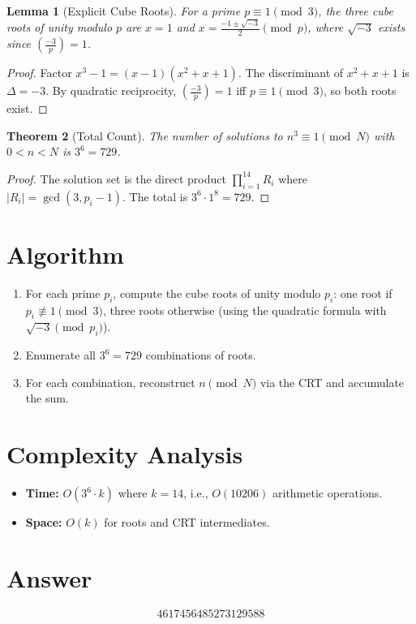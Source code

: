 \documentclass[12pt]{article}
\newtheorem{theorem}{Theorem}
\newtheorem{lemma}[theorem]{Lemma}
\begin{document}
\begin{lemma}[Explicit Cube Roots]
For a prime $p \equiv 1 \pmod{3}$, the three cube roots of unity modulo $p$ are $x = 1$ and $x = \frac{-1 \pm \sqrt{-3}}{2} \pmod{p}$, where $\sqrt{-3}$ exists since $\left(\frac{-3}{p}\right) = 1$.
\end{lemma}

\begin{proof}
Factor $x^3 - 1 = (x-1)(x^2+x+1)$. The discriminant of $x^2+x+1$ is $\Delta = -3$. By quadratic reciprocity, $\left(\frac{-3}{p}\right) = 1$ iff $p \equiv 1 \pmod{3}$, so both roots exist.
\end{proof}

\begin{theorem}[Total Count]
The number of solutions to $n^3 \equiv 1 \pmod{N}$ with $0 < n < N$ is $3^6 = 729$.
\end{theorem}

\begin{proof}
The solution set is the direct product $\prod_{i=1}^{14} R_i$ where $|R_i| = \gcd(3, p_i - 1)$. The total is $3^6 \cdot 1^8 = 729$.
\end{proof}

\section{Algorithm}
\begin{enumerate}
    \item For each prime $p_i$, compute the cube roots of unity modulo $p_i$: one root if $p_i \not\equiv 1 \pmod{3}$, three roots otherwise (using the quadratic formula with $\sqrt{-3} \pmod{p_i}$).
    \item Enumerate all $3^6 = 729$ combinations of roots.
    \item For each combination, reconstruct $n \pmod{N}$ via the CRT and accumulate the sum.
\end{enumerate}

\section{Complexity Analysis}
\begin{itemize}
    \item \textbf{Time:} $O(3^6 \cdot k)$ where $k = 14$, i.e., $O(10206)$ arithmetic operations.
    \item \textbf{Space:} $O(k)$ for roots and CRT intermediates.
\end{itemize}

\section{Answer}

\[
\boxed{4617456485273129588}
\]
\end{document}
